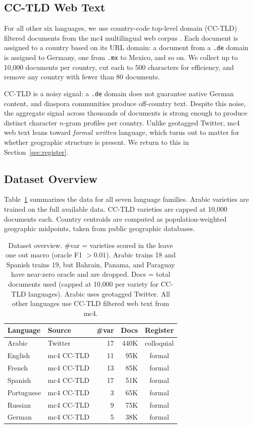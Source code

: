 \documentclass[11pt]{article}
\begin{document}
\subsection{CC-TLD Web Text}

For all other six languages, we use country-code top-level domain (CC-TLD) filtered documents from the mc4 multilingual web corpus \cite{nllb-team-2022-language}.
Each document is assigned to a country based on its URL domain: a document from a \texttt{.de} domain is assigned to Germany, one from \texttt{.mx} to Mexico, and so on.
We collect up to 10{,}000 documents per country, cut each to 500 characters for efficiency, and remove any country with fewer than 80 documents.

CC-TLD is a noisy signal: a \texttt{.de} domain does not guarantee native German content, and diaspora communities produce off-country text.
Despite this noise, the aggregate signal across thousands of documents is strong enough to produce distinct character $n$-gram profiles per country.
Unlike geotagged Twitter, mc4 web text leans toward \emph{formal written} language, which turns out to matter for whether geographic structure is present.
We return to this in Section~\ref{sec:register}.

\subsection{Dataset Overview}

Table~\ref{tab:data} summarizes the data for all seven language families.
Arabic varieties are trained on the full available data.
CC-TLD varieties are capped at 10{,}000 documents each.
Country centroids are computed as population-weighted geographic midpoints, taken from public geographic databases.

\begin{table}[t]
\centering
\small
\setlength{\tabcolsep}{4pt}
\begin{tabular}{llrrc}
\toprule
\textbf{Language} & \textbf{Source} & \textbf{\#var} & \textbf{Docs} & \textbf{Register} \\
\midrule
Arabic     & Twitter    & 17 & 440K & colloquial \\
English    & mc4 CC-TLD & 11 &  95K & formal \\
French     & mc4 CC-TLD & 13 &  85K & formal \\
Spanish    & mc4 CC-TLD & 17 &  51K & formal \\
Portuguese & mc4 CC-TLD &  3 &  65K & formal \\
Russian    & mc4 CC-TLD &  9 &  75K & formal \\
German     & mc4 CC-TLD &  5 &  38K & formal \\
\bottomrule
\end{tabular}
\caption{Dataset overview. \#var = varieties scored in the leave one out macro (oracle F1 ${>}0.01$).
  Arabic trains 18 and Spanish trains 19, but Bahrain, Panama, and Paraguay have near-zero oracle and are dropped.
  Docs = total documents used (capped at 10{,}000 per variety for CC-TLD languages).
  Arabic uses geotagged Twitter.
  All other languages use CC-TLD filtered web text from mc4.}
\label{tab:data}
\end{table}
\end{document}
